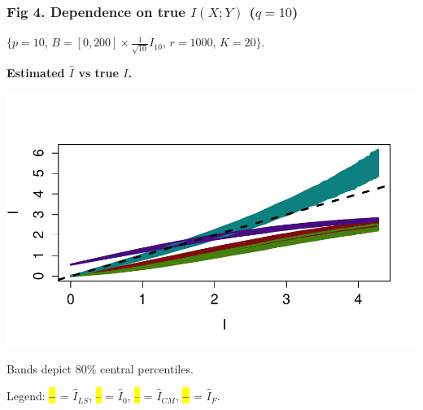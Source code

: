 \documentclass{beamer}
\makeatletter
\newcommand\SoulColor{%
  \let\set@color\beamerorig@set@color
  \let\reset@color\beamerorig@reset@color}
\makeatother
\begin{document}
\begin{frame}
\frametitle{Fig 4. Dependence on true $I(X; Y)$ ($q = 10$)}

\small{$\{p = 10$, $B = [0, 200]\times \frac{1}{\sqrt{10}}I_{10}$, $r = 1000$, $K = 20\}$.}

\begin{center}
\textbf{Estimated $\hat{I}$ vs true $I$.} 

\includegraphics[scale = 0.5, clip=true, trim=0.4in 0.5in 0 0.5in]{../info_theory_sims/fig4.pdf}

Bands depict 80\% central percentiles.

Legend: 
\textbf{\textcolor{color3}{\SoulColor\hl{ -- }}} = $\hat{I}_{LS}$, 
\textcolor{color4}{\SoulColor\hl{ -- }} = $\hat{I}_0$,
\textcolor{color1}{\SoulColor\hl{ -- }} = $\hat{I}_{CM}$,
\textbf{\textcolor{color2}{\SoulColor\hl{ -- }}} = $\hat{I}_{F}$.

\end{center}

\end{frame}
\end{document}

